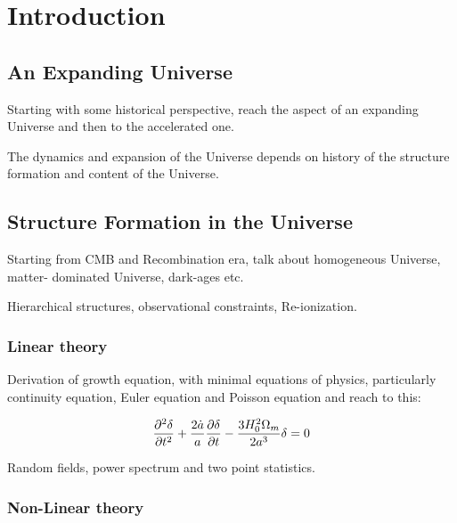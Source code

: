 \chapter*{Introduction}


\section{An Expanding Universe}

Starting with some historical perspective, reach the aspect of an expanding 
Universe and then to the accelerated one. 

The dynamics and expansion of the Universe depends on history of the structure
formation and content of the Universe.


\section{Structure Formation in the Universe}

Starting from CMB and Recombination era, talk about homogeneous Universe, matter-
dominated Universe, dark-ages etc.

Hierarchical structures, observational constraints, Re-ionization.

\subsection{Linear theory}

Derivation of growth equation, with minimal equations of physics, particularly
continuity equation, Euler equation and Poisson equation and reach to this:

\begin{equation}
\centering
\dfrac{\partial^2\delta}{\partial t^2} + \dfrac{2\dot{a}}{a} \dfrac{\partial\delta}{\partial t}
 - \dfrac{3H_0^2 \Omega_m}{2a^3} \delta = 0
\end{equation}

Random fields, power spectrum and two point statistics.
\subsection{Non-Linear theory}
